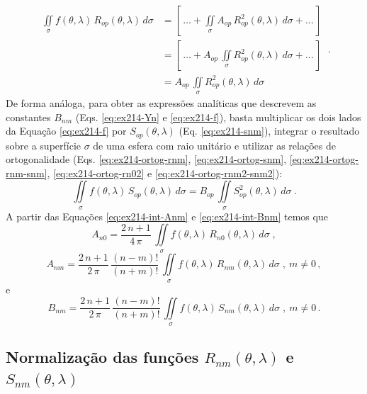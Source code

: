 \documentclass[10pt,a4paper,fleqn]{article}
\begin{document}
\begin{equation}
\begin{split}
\iint \limits_{\sigma} 
f(\theta,\lambda) \, R_{op}(\theta,\lambda) \, d \sigma
& = \left[ \, \hdots + 
\iint \limits_{\sigma} A_{op} \, R_{op}^{2}(\theta,\lambda) \, d \sigma
+ \hdots \, \right] \\
& = \left[ \, \hdots + 
A_{op} \, \iint \limits_{\sigma} R_{op}^{2}(\theta,\lambda) \, d \sigma
+ \hdots \, \right] \\
& = 
A_{op} \, \iint \limits_{\sigma} R_{op}^{2}(\theta,\lambda) \, d \sigma
\end{split} \: .
\label{eq:ex214-int-Anm}
\end{equation}
De forma an\'{a}loga, para obter as expressões analíticas que descrevem as 
constantes $B_{nm}$ (Eqs. \ref{eq:ex214-Yn} e \ref{eq:ex214-f}), basta multiplicar os 
dois lados da Equa\c{c}ão \ref{eq:ex214-f} por $S_{op}(\theta,\lambda)$ (Eq. \ref{eq:ex214-snm}), integrar o resultado sobre a 
superf\'{i}cie $\sigma$ de uma esfera com raio unit\'{a}rio e utilizar as rela\c{c}\~{o}es de ortogonalidade 
(Eqs. \ref{eq:ex214-ortog-rnm}, \ref{eq:ex214-ortog-snm}, \ref{eq:ex214-ortog-rnm-snm}, \ref{eq:ex214-ortog-rn02} e 
\ref{eq:ex214-ortog-rnm2-snm2}):
\begin{equation}
\iint \limits_{\sigma} 
f(\theta,\lambda) \, S_{op}(\theta,\lambda) \, d \sigma
= B_{op} \, \iint \limits_{\sigma} S_{op}^{2}(\theta,\lambda) \, d \sigma \: .
\label{eq:ex214-int-Bnm}
\end{equation}
A partir das Equa\c{c}\~{o}es \ref{eq:ex214-int-Anm} e \ref{eq:ex214-int-Bnm} temos que
\begin{equation}
A_{n0} = \dfrac{2 \, n + 1}{4 \, \pi} \, 
\iint \limits_{\sigma} 
f(\theta,\lambda) \, R_{n0}(\theta,\lambda) \, d \sigma \; ,
\label{eq:ex214-An0}
\end{equation}
\begin{equation}
A_{nm} = \dfrac{2 \, n + 1}{2 \, \pi} \, \dfrac{(n - m)!}{(n + m)!} \,
\iint \limits_{\sigma} 
f(\theta,\lambda) \, R_{nm}(\theta,\lambda) \, d \sigma \; , \: m \neq 0 \, ,
\label{eq:ex214-Anm}
\end{equation}
e
\begin{equation}
B_{nm} = \dfrac{2 \, n + 1}{2 \, \pi} \, \dfrac{(n - m)!}{(n + m)!} \,
\iint \limits_{\sigma} 
f(\theta,\lambda) \, S_{nm}(\theta,\lambda) \, d \sigma \; , \: m \neq 0 \, .
\label{eq:ex214-Anm}
\end{equation}

\subsection{Normaliza\c{c}\~{a}o das fun\c{c}\~{o}es $R_{nm}(\theta, \lambda)$ e $S_{nm}(\theta, \lambda)$}
\end{document}
